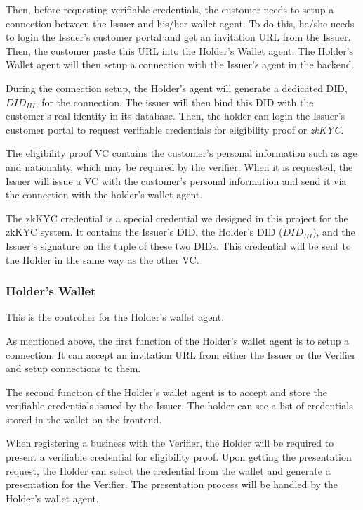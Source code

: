 \documentclass[
]{report}
\begin{document}
Then, before requesting verifiable credentials, the customer needs to setup a 
connection between the Issuer and his/her wallet agent. To do this, he/she
needs to login the Issuer's customer portal and get an invitation URL from
the Issuer. Then, the customer paste this URL into the Holder's Wallet agent.
The Holder's Wallet agent will then setup a connection with the Issuer's
agent in the backend.

During the connection setup, the Holder's agent will generate a dedicated DID,
\texttt{$DID_{HI}$}, for the connection. The issuer will then bind this DID
with the customer's real identity in its database.
Then, the holder can login the Issuer's customer portal to request verifiable
credentials for eligibility proof or \emph{zkKYC}.

The eligibility proof VC contains the customer's personal information such as
age and nationality, which may be required by the verifier. When it is
requested, the Issuer will issue a VC with the customer's personal information
and send it via the connection with the holder's wallet agent.

The zkKYC credential is a special credential we designed in this project for
the zkKYC system. It contains the Issuer's DID, the Holder's DID 
(\texttt{$DID_{HI}$}), and the Issuer's signature on the tuple of these two
DIDs. This credential will be sent to the Holder in the same way as the other
VC.

\subsubsection{Holder's Wallet}
This is the controller for the Holder's wallet agent.

As mentioned above, the first function of the Holder's wallet agent is to
setup a connection. It can accept an invitation URL from either the Issuer
or the Verifier and setup connections to them.

The second function of the Holder's wallet agent is to accept and store the
verifiable credentials issued by the Issuer. The holder can see a list of
credentials stored in the wallet on the frontend.

When registering a business with the Verifier, the Holder will be required
to present a verifiable credential for eligibility proof. Upon getting the
presentation request, the Holder can select the credential from the wallet
and generate a presentation for the Verifier. The presentation process will
be handled by the Holder's wallet agent.
\end{document}
